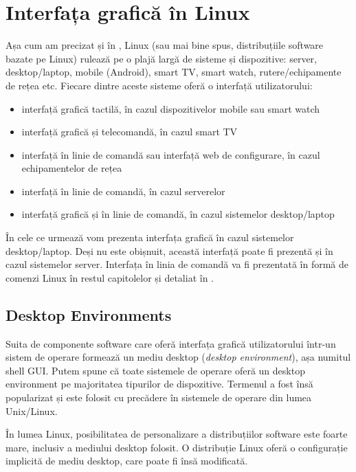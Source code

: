 \section{Interfața grafică în Linux}
\label{sec:ui:linux-gui}

Așa cum am precizat și în , Linux (sau mai bine spus, distribuțiile software bazate pe Linux) rulează pe o plajă largă de sisteme și dispozitive: server, desktop/laptop, mobile (Android), smart TV, smart watch, rutere/echipamente de rețea etc. Fiecare dintre aceste sisteme oferă o interfață utilizatorului:

\begin{itemize}
  \item interfață grafică tactilă, în cazul dispozitivelor mobile sau smart watch
  \item interfață grafică și telecomandă, în cazul smart TV
  \item interfață în linie de comandă sau interfață web de configurare, în cazul echipamentelor de rețea
  \item interfață în linie de comandă, în cazul serverelor
  \item interfață grafică și în linie de comandă, în cazul sistemelor desktop/laptop
\end{itemize}

În cele ce urmează vom prezenta interfața grafică în cazul sistemelor desktop/laptop. Deși nu este obișnuit, această interfață poate fi prezentă și în cazul sistemelor server. Interfața în linia de comandă va fi prezentată în formă de comenzi Linux în restul capitolelor și detaliat în .

\subsection{Desktop Environments}
\label{sec:ui:desktop-environments}

Suita de componente software care oferă interfața grafică utilizatorului într-un sistem de operare formează un mediu desktop (\textit{desktop environment}), așa numitul shell GUI. Putem spune că toate sistemele de operare oferă un desktop environment pe majoritatea tipurilor de dispozitive. Termenul a fost însă popularizat și este folosit cu precădere în sistemele de operare din lumea Unix/Linux.

În lumea Linux, posibilitatea de personalizare a distribuțiilor software este foarte mare, inclusiv a mediului desktop folosit. O distribuție Linux oferă o configurație implicită de mediu desktop, care poate fi însă modificată.

